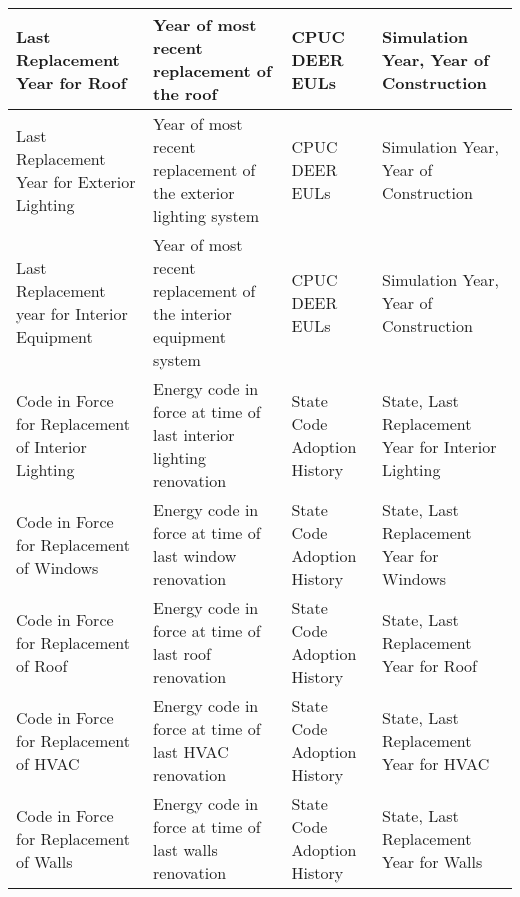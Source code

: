 \begin{center}
\begin{longtable}{|p{1.3in}|p{1.5in}|p{1.5in}|p{1.5in}|}
Last Replacement Year for Roof                                  & Year of most recent replacement of the roof                                    & CPUC DEER EULs                                              & Simulation Year, Year of Construction                                                                \\ \hline
Last Replacement Year for Exterior Lighting                     & Year of most recent replacement of the exterior lighting system                & CPUC DEER EULs                                              & Simulation Year, Year of Construction                                                                \\ \hline
Last Replacement year for Interior Equipment                    & Year of most recent replacement of the interior equipment system               & CPUC DEER EULs                                              & Simulation Year, Year of Construction                                                                \\ \hline
Code in Force for Replacement of Interior Lighting              & Energy code in force at time of last interior lighting renovation              & State Code Adoption History                                 & State, Last Replacement Year for Interior Lighting                                                   \\ \hline
Code in Force for Replacement of Windows                        & Energy code in force at time of last window renovation                         & State Code Adoption History                                 & State, Last Replacement Year for Windows                                                             \\ \hline
Code in Force for Replacement of Roof                           & Energy code in force at time of last roof renovation                           & State Code Adoption History                                 & State, Last Replacement Year for Roof                                                                \\ \hline
Code in Force for Replacement of HVAC                           & Energy code in force at time of last HVAC renovation                           & State Code Adoption History                                 & State, Last Replacement Year for HVAC                                                                \\ \hline
Code in Force for Replacement of Walls                          & Energy code in force at time of last walls renovation                          & State Code Adoption History                                 & State, Last Replacement Year for Walls                                                               \\ \hline

\end{longtable}
\end{center}
